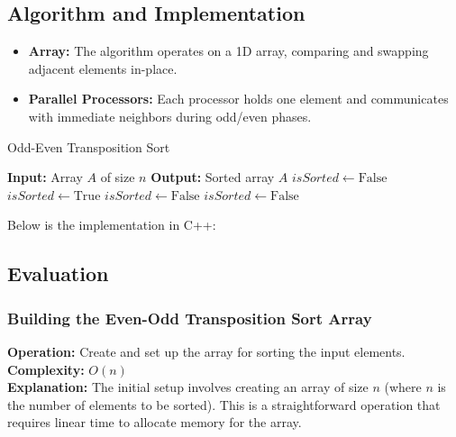 \subsection{Algorithm and Implementation}
\begin{itemize}
    \item \textbf{Array:} The algorithm operates on a 1D array, comparing and swapping adjacent elements in-place.
    \item \textbf{Parallel Processors:} Each processor holds one element and communicates with immediate neighbors during odd/even phases.
\end{itemize}

\begin{algorithm}
    \caption{Odd-Even Transposition Sort}
    \begin{algorithmic}[1]
        \State \textbf{Input:} Array $A$ of size $n$
        \State \textbf{Output:} Sorted array $A$
            \State $isSorted \gets \text{False}$
                \State $isSorted \gets \text{True}$
                        \State {}
                        \State $isSorted \gets \text{False}$
                    \EndIf
                \EndFor
                        \State {}
                        \State $isSorted \gets \text{False}$
                    \EndIf
                \EndFor
            \EndWhile
        \EndFunction
    \end{algorithmic}
\end{algorithm}

Below is the implementation in C++:



\subsection{Evaluation}
\subsubsection{Building the Even-Odd Transposition Sort Array}
\textbf{Operation:} Create and set up the array for sorting the input elements. \\
\textbf{Complexity:} $O(n)$ \\
\textbf{Explanation:} The initial setup involves creating an array of size $n$ (where $n$ is the number of elements to be sorted). This is a straightforward operation that requires linear time to allocate memory for the array.

